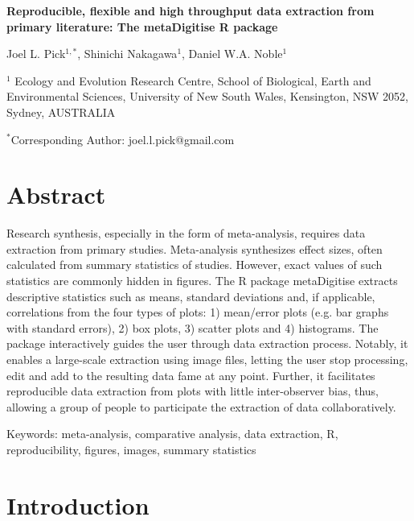 \documentclass[12pt]{article}
\newcommand{\pkg}[1]{{\fontseries{b}\selectfont #1}}
\let\proglang=\textsf
\begin{document}
\newenvironment{CodeChunk}{}{}

\raggedright


\textbf{Reproducible, flexible and high throughput data extraction from primary literature: The \pkg{metaDigitise} \proglang{R} package}

Joel L. Pick$^{1,*}$, Shinichi Nakagawa$^1$, Daniel W.A. Noble$^1$

$^1$
  Ecology and Evolution Research Centre, School of Biological, Earth and Environmental Sciences,  University of New South Wales, Kensington, NSW 2052, Sydney, AUSTRALIA

 $^*$Corresponding Author: joel.l.pick@gmail.com\\




\section*{Abstract}
Research synthesis, especially in the form of meta-analysis, requires data extraction from primary studies. Meta-analysis synthesizes effect sizes, often calculated from summary statistics of studies. However, exact values of such statistics are commonly hidden in figures. The R package \pkg{metaDigitise} extracts descriptive statistics such as means, standard deviations and, if applicable, correlations from the four types of plots: 1) mean/error plots (e.g. bar graphs with standard errors), 2) box plots, 3) scatter plots and 4) histograms. The package interactively guides the user through data extraction process. Notably, it enables a large-scale extraction using image files, letting the user stop processing, edit and add to the resulting data fame at any point. Further, it facilitates reproducible data extraction from plots with little inter-observer bias, thus, allowing a group of people to participate the extraction of data collaboratively.


 Keywords: meta-analysis, comparative analysis, data extraction, \proglang{R}, reproducibility, figures, images, summary statistics





\section{Introduction}
\end{document}
